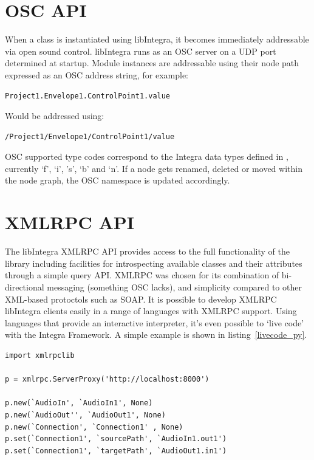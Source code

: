 \documentclass[twoside,10pt,a4paper]{article}
\begin{document}
\section{OSC API}

When a class is instantiated using libIntegra, it becomes immediately addressable via open sound control. libIntegra runs as an OSC server on a UDP port determined at startup. Module instances are addressable using their node path expressed as an OSC address string, for example:
{\small \begin{verbatim}Project1.Envelope1.ControlPoint1.value\end{verbatim} }
\begin{flushleft}
Would be addressed using:
\end{flushleft}
{\small {\begin{verbatim}/Project1/Envelope1/ControlPoint1/value\end{verbatim}}

OSC supported type codes correspond to the Integra data types defined in \cite{Bullock:03}, currently `f', `i', 's', `b' and `n'. If a node gets renamed, deleted or moved within the node graph, the OSC namespace is updated accordingly.

\section{XMLRPC API}\label{sec:xmlrpc}

The libIntegra XMLRPC API provides access to the full functionality of the library including facilities for introspecting available classes and their attributes through a simple query API. XMLRPC was chosen for its combination of bi-directional messaging (something OSC lacks), and simplicity compared to other XML-based protoctols such as SOAP. It is possible to develop XMLRPC libIntegra clients easily in a range of languages with XMLRPC support. Using languages that provide an interactive interpreter, it's even possible to `live code' with the Integra Framework. A simple example is shown in listing~\ref{livecode_py}.

\begin{lstlisting}[label=livecode_py,caption=XMLRPC API from Python]
import xmlrpclib

p = xmlrpc.ServerProxy('http://localhost:8000')

p.new(`AudioIn', `AudioIn1', None)
p.new(`AudioOut'', `AudioOut1', None)
p.new(`Connection', `Connection1' , None)
p.set(`Connection1', `sourcePath', `AudioIn1.out1')
p.set(`Connection1', `targetPath', `AudioOut1.in1')


\end{lstlisting}}
\end{document}
